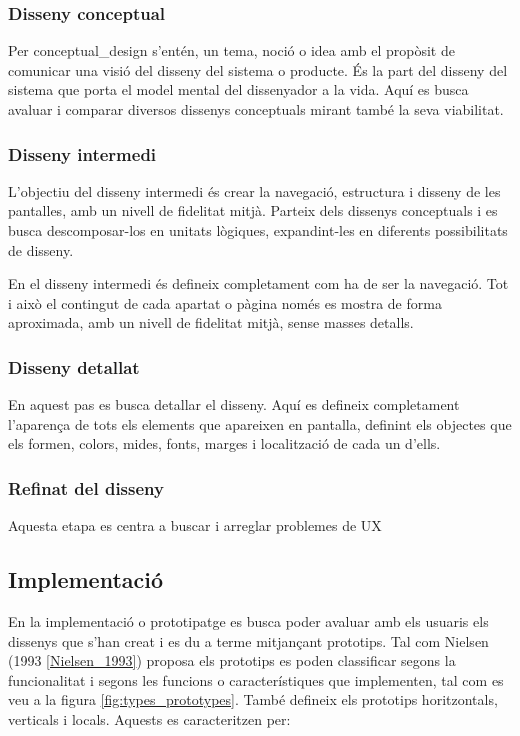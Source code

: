 \subsubsection{Disseny conceptual}
Per \gls{conceptual_design} s'entén, un tema, noció o idea amb el propòsit de comunicar una visió del disseny del sistema o producte. És la part del disseny del sistema que porta el model mental del dissenyador a la vida. 
Aquí es busca avaluar i comparar diversos dissenys conceptuals mirant també la seva viabilitat. 

\subsubsection{Disseny intermedi}
L'objectiu del disseny intermedi és crear la navegació, estructura i disseny de les pantalles, amb un nivell de fidelitat mitjà. Parteix dels dissenys conceptuals i es busca descomposar-los en unitats lògiques, expandint-les en diferents possibilitats de disseny. 

En el disseny intermedi és defineix completament com ha de ser la navegació. Tot i això el contingut de cada apartat o pàgina només es mostra de forma aproximada, amb un nivell de fidelitat mitjà, sense masses detalls. 

\subsubsection{Disseny detallat}
En aquest pas es busca detallar el disseny. Aquí es defineix completament l'aparença de tots els elements que apareixen en pantalla, definint els objectes que els formen, colors, mides, fonts, marges i localització de cada un d'ells. 


\subsubsection{Refinat del disseny}
Aquesta etapa es centra a buscar i arreglar problemes de \ac{UX} 


\subsection{Implementació}
En la implementació o prototipatge es busca poder avaluar amb els usuaris els dissenys que s'han creat i es du a terme mitjançant prototips. Tal com Nielsen (1993 \ref{Nielsen_1993}) proposa els prototips es poden classificar segons la funcionalitat i segons les funcions o característiques que implementen, tal com es veu a la figura \ref{fig:types_prototypes}. També defineix els prototips horitzontals, verticals i locals. Aquests es caracteritzen per:

